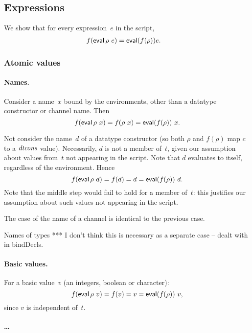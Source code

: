 \subsection{Expressions}

We show that for every expression~$e$ in the script,
\begin{eqnarray*}
f(\mathop{\sf eval} \rho ~ e) & = \mathop{\sf eval} (f(\rho)) e .
\end{eqnarray*}

\framebox{\ldots}


\subsubsection{Atomic values}

\paragraph{Names.}

Consider a name~$x$ bound by the environments, other than a datatype
constructor or channel name.  Then
\[
f(\mathop{\sf eval} \rho~x) = f(\rho~x) = \mathop{\sf eval} (f(\rho))~x.
\]

Not consider the name~$d$ of a datatype constructor (so both $\rho$ and
$f(\rho)$ map $c$ to a $\mathop{\it dtcons}$ value).  Necessarily, $d$ is not a member
of~$t$, given our assumption about values from~$t$ not appearing in the
script.  Note that $d$ evaluates to itself, regardless of the environment.
Hence
\[
f(\mathop{\sf eval} \rho~d) = f(d) = d = \mathop{\sf eval} (f(\rho))~d.
\]
Note that the middle step would fail to hold for a member of~$t$: this
justifies our assumption about such values not appearing in the script. 

The case of the name of a channel is identical to the previous case. 

Names of types *** I don't think this is necessary as a separate case -- dealt
with in bindDecls.



\paragraph{Basic values.}

For a basic value~$v$ (an integers, boolean or character):
\[
f(\mathop{\sf eval} \rho~v) = f(v) = v = \mathop{\sf eval}(f(\rho))~v,
\]
since $v$ is independent of~$t$. 


\paragraph{\ldots}


